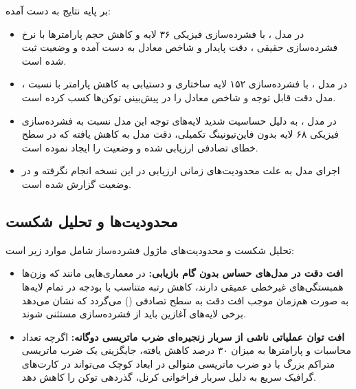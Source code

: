 بر پایه نتایج به دست آمده:
\begin{itemize}
    \item در مدل ، با فشرده‌سازی فیزیکی ۳۶ لایه و کاهش حجم پارامترها با نرخ فشرده‌سازی حقیقی ، دقت پایدار  و شاخص  معادل  به دست آمده و وضعیت  ثبت شده است.
    \item در مدل ، با فشرده‌سازی ۱۵۲ لایه ساختاری و دستیابی به کاهش پارامتر با نسبت ، مدل دقت قابل توجه  و شاخص  معادل  را در پیش‌بینی توکن‌ها کسب کرده است.
    \item در مدل ، به دلیل حساسیت شدید لایه‌های توجه این مدل نسبت به فشرده‌سازی فیزیکی ۶۸ لایه بدون فاین‌تیونینگ تکمیلی، دقت مدل به  کاهش یافته که در سطح خطای تصادفی ارزیابی شده و وضعیت  را ایجاد نموده است.
    \item اجرای مدل  به علت محدودیت‌های زمانی ارزیابی در این نسخه انجام نگرفته و در وضعیت  گزارش شده است.
\end{itemize}

\subsection{محدودیت‌ها و تحلیل شکست}
تحلیل شکست و محدودیت‌های ماژول فشرده‌ساز  شامل موارد زیر است:
\begin{itemize}
    \item \textbf{افت دقت در مدل‌های حساس بدون گام بازیابی:} در معماری‌هایی مانند  که وزن‌ها همبستگی‌های غیرخطی عمیقی دارند، کاهش رتبه متناسب با بودجه در تمام لایه‌ها به صورت هم‌زمان موجب افت دقت به سطح تصادفی () می‌گردد که نشان می‌دهد برخی لایه‌های آغازین باید از فشرده‌سازی مستثنی شوند.
    \item \textbf{افت توان عملیاتی ناشی از سربار زنجیره‌ای ضرب ماتریسی دوگانه:} اگرچه تعداد محاسبات و پارامترها به میزان ۳۰ درصد کاهش یافته، جایگزینی یک ضرب ماتریسی متراکم بزرگ با دو ضرب ماتریسی متوالی در ابعاد کوچک می‌تواند در کارت‌های گرافیک سریع به دلیل سربار فراخوانی کرنل، گذردهی توکن را کاهش دهد.
\end{itemize}
